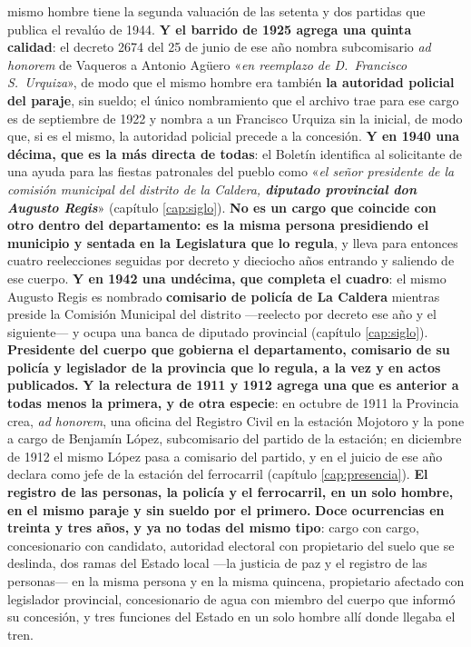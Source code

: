 mismo hombre tiene la segunda valuación de las setenta y dos partidas que publica el revalúo de 1944.
\textbf{Y el barrido de 1925 agrega una quinta calidad}: el decreto 2674 del 25 de junio de ese
año nombra subcomisario \textit{ad honorem} de Vaqueros a Antonio Agüero «\textit{en reemplazo de
D.\ Francisco S.\ Urquiza}», de modo que el mismo hombre era también \textbf{la autoridad policial
del paraje}, sin sueldo; el único nombramiento que el archivo trae para ese cargo es de septiembre
de 1922 y nombra a un Francisco Urquiza sin la inicial, de modo que, si es el mismo, la autoridad
policial precede a la concesión.
\textbf{Y en 1940 una décima, que es la más directa de todas}: el Boletín
identifica al solicitante de una ayuda para las fiestas patronales del pueblo
como «\textit{el señor presidente de la comisión municipal del distrito de la
Caldera, \textbf{diputado provincial don Augusto Regis}}»
(capítulo \ref{cap:siglo}). \textbf{No es un cargo que coincide con otro dentro
del departamento: es la misma persona presidiendo el municipio y sentada en la
Legislatura que lo regula}, y lleva para entonces cuatro reelecciones seguidas
por decreto y dieciocho años entrando y saliendo de ese cuerpo. \textbf{Y en 1942 una undécima, que completa el cuadro}: el mismo Augusto
Regis es nombrado \textbf{comisario de policía de La
Caldera} mientras preside la Comisión Municipal del distrito ---reelecto por
decreto ese año y el siguiente--- y ocupa una banca de diputado provincial
(capítulo \ref{cap:siglo}). \textbf{Presidente del cuerpo que gobierna el
departamento, comisario de su policía y legislador de la provincia que lo
regula, a la vez y en actos publicados.} \textbf{Y la relectura de 1911 y 1912 agrega una que es
anterior a todas menos la primera, y de otra especie}: en octubre de 1911 la Provincia crea, \textit{ad
honorem}, una oficina del Registro Civil en la estación Mojotoro y la pone a cargo de Benjamín
López, subcomisario del partido de la estación; en diciembre de 1912 el
mismo López pasa a comisario del partido, y en el juicio de ese año declara como jefe de la
estación del ferrocarril (capítulo \ref{cap:presencia}). \textbf{El registro de las personas, la
policía y el ferrocarril, en un solo hombre, en el mismo paraje y sin sueldo por el primero.}
\textbf{Doce ocurrencias en treinta y tres años, y ya no todas del mismo tipo}: cargo con cargo, concesionario con
candidato, autoridad electoral con propietario del suelo que se deslinda, dos ramas del
Estado local ---la justicia de paz y el registro de las personas--- en la misma persona y en la
misma quincena, propietario afectado con legislador provincial, concesionario de agua
con miembro del cuerpo que informó su concesión, y tres funciones del Estado en un solo hombre
allí donde llegaba el tren.

